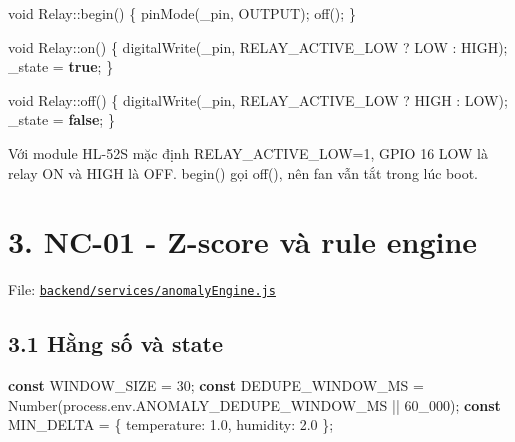 \documentclass[11pt,oneside,openany]{book}
\renewcommand{\texttt}[1]{{\ttfamily\small #1}}
\newenvironment{Shaded}{\begin{snugshade}}{\end{snugshade}}
\newcommand{\AttributeTok}[1]{\textcolor[rgb]{0.16,0.50,0.73}{#1}}
\newcommand{\BuiltInTok}[1]{\textcolor[rgb]{0.50,0.55,0.55}{#1}}
\newcommand{\DataTypeTok}[1]{\textcolor[rgb]{0.16,0.50,0.73}{#1}}
\newcommand{\DecValTok}[1]{\textcolor[rgb]{0.96,0.45,0.00}{#1}}
\newcommand{\FloatTok}[1]{\textcolor[rgb]{0.96,0.45,0.00}{#1}}
\newcommand{\KeywordTok}[1]{\textcolor[rgb]{0.81,0.81,0.76}{\textbf{#1}}}
\newcommand{\NormalTok}[1]{\textcolor[rgb]{0.81,0.81,0.76}{#1}}
\newcommand{\OperatorTok}[1]{\textcolor[rgb]{0.81,0.81,0.76}{#1}}
\renewenvironment{Shaded}{%
  \def\FrameCommand{\fboxsep=8pt\colorbox{shadecolor}}%
  \MakeFramed{\advance\hsize-\width\FrameRestore}%
}{\endMakeFramed}
\begin{document}
\begin{Shaded}
\begin{Highlighting}[]
\DataTypeTok{void}\NormalTok{ Relay}\OperatorTok{::}\NormalTok{begin}\OperatorTok{()} \OperatorTok{\{}
\NormalTok{  pinMode}\OperatorTok{(}\NormalTok{\_pin}\OperatorTok{,}\NormalTok{ OUTPUT}\OperatorTok{);}
\NormalTok{  off}\OperatorTok{();}
\OperatorTok{\}}

\DataTypeTok{void}\NormalTok{ Relay}\OperatorTok{::}\NormalTok{on}\OperatorTok{()} \OperatorTok{\{}
\NormalTok{  digitalWrite}\OperatorTok{(}\NormalTok{\_pin}\OperatorTok{,}\NormalTok{ RELAY\_ACTIVE\_LOW }\OperatorTok{?}\NormalTok{ LOW }\OperatorTok{:}\NormalTok{ HIGH}\OperatorTok{);}
\NormalTok{  \_state }\OperatorTok{=} \KeywordTok{true}\OperatorTok{;}
\OperatorTok{\}}

\DataTypeTok{void}\NormalTok{ Relay}\OperatorTok{::}\NormalTok{off}\OperatorTok{()} \OperatorTok{\{}
\NormalTok{  digitalWrite}\OperatorTok{(}\NormalTok{\_pin}\OperatorTok{,}\NormalTok{ RELAY\_ACTIVE\_LOW }\OperatorTok{?}\NormalTok{ HIGH }\OperatorTok{:}\NormalTok{ LOW}\OperatorTok{);}
\NormalTok{  \_state }\OperatorTok{=} \KeywordTok{false}\OperatorTok{;}
\OperatorTok{\}}
\end{Highlighting}
\end{Shaded}

Với module HL-52S mặc định \texttt{RELAY\_ACTIVE\_LOW=1}, GPIO 16 LOW là
relay ON và HIGH là OFF. \texttt{begin()} gọi \texttt{off()}, nên fan
vẫn tắt trong lúc boot.

\section{3. NC-01 - Z-score và rule
engine}\label{3-nc-01---z-score-vuxe0-rule-engine}

File:
\href{../backend/services/anomalyEngine.js}{\nolinkurl{backend/services/anomalyEngine.js}}

\subsection{3.1 Hằng số và
state}\label{31-hux1eb1ng-sux1ed1-vuxe0-state}

\begin{Shaded}
\begin{Highlighting}[]
\KeywordTok{const}\NormalTok{ WINDOW\_SIZE }\OperatorTok{=} \DecValTok{30}\OperatorTok{;}
\KeywordTok{const}\NormalTok{ DEDUPE\_WINDOW\_MS }\OperatorTok{=} \BuiltInTok{Number}\NormalTok{(}\BuiltInTok{process}\OperatorTok{.}\AttributeTok{env}\OperatorTok{.}\AttributeTok{ANOMALY\_DEDUPE\_WINDOW\_MS} \OperatorTok{||} \DecValTok{60\_000}\NormalTok{)}\OperatorTok{;}
\KeywordTok{const}\NormalTok{ MIN\_DELTA }\OperatorTok{=}\NormalTok{ \{ }\DataTypeTok{temperature}\OperatorTok{:} \FloatTok{1.0}\OperatorTok{,} \DataTypeTok{humidity}\OperatorTok{:} \FloatTok{2.0}\NormalTok{ \}}\OperatorTok{;}
\end{Highlighting}
\end{Shaded}
\end{document}
